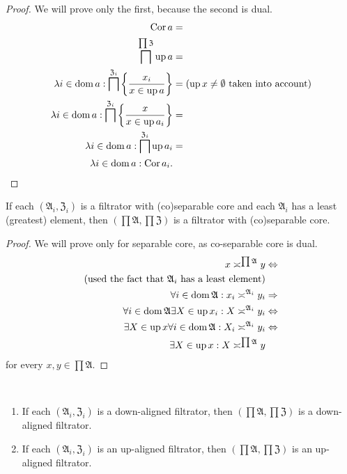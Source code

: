 \begin{proof}
We will prove only the first, because the second is dual.
\begin{align*}
\operatorname{Cor} a & =\\
\bigsqcap^{\prod\mathfrak{Z}}\operatorname{up} a & =\\
\lambda i\in\operatorname{dom} a:\bigsqcap^{\mathfrak{Z}_{i}}\left\{ \frac{x_{i}}{x\in\operatorname{up} a}\right\} & =\text{(\ensuremath{\operatorname{up} x\ne\emptyset} taken into account)}\\
\lambda i\in\operatorname{dom} a:\bigsqcap^{\mathfrak{Z}_{i}}\left\{ \frac{x}{x\in\operatorname{up} a_{i}}\right\} & =\\
\lambda i\in\operatorname{dom} a:\bigsqcap^{\mathfrak{Z}_{i}}\operatorname{up} a_{i} & =\\
\lambda i\in\operatorname{dom} a:\operatorname{Cor} a_{i}.
\end{align*}
\end{proof}
\begin{prop}
If each $(\mathfrak{A}_{i},\mathfrak{Z}_{i})$ is a filtrator with
(co)separable core and each $\mathfrak{A}_{i}$ has a least (greatest)
element, then $\left(\prod\mathfrak{A},\prod\mathfrak{Z}\right)$
is a filtrator with (co)separable core.\end{prop}
\begin{proof}
We will prove only for separable core, as co-separable core is dual.
\begin{align*}
x\asymp^{\prod\mathfrak{A}}y & \Leftrightarrow\\
\text{(used the fact that \ensuremath{\mathfrak{A}_{i}} has a least element)}\\
\forall i\in\operatorname{dom}\mathfrak{A}:x_{i}\asymp^{\mathfrak{A}_{i}}y_{i} & \Rightarrow\\
\forall i\in\operatorname{dom}\mathfrak{A}\exists X\in\operatorname{up} x_{i}:X\asymp^{\mathfrak{A}_{i}}y_{i} & \Leftrightarrow\\
\exists X\in\operatorname{up} x\forall i\in\operatorname{dom}\mathfrak{A}:X_{i}\asymp^{\mathfrak{A}_{i}}y_{i} & \Leftrightarrow\\
\exists X\in\operatorname{up} x:X\asymp^{\prod\mathfrak{A}}y
\end{align*}
for every $x,y\in\prod\mathfrak{A}$.\end{proof}
\begin{obvious}
~
\begin{enumerate}
\item If each $(\mathfrak{A}_{i},\mathfrak{Z}_{i})$ is a down-aligned filtrator,
then $\left(\prod\mathfrak{A},\prod\mathfrak{Z}\right)$ is a down-aligned
filtrator.
\item If each $(\mathfrak{A}_{i},\mathfrak{Z}_{i})$ is an up-aligned filtrator,
then $\left(\prod\mathfrak{A},\prod\mathfrak{Z}\right)$ is an up-aligned
filtrator.
\end{enumerate}
\end{obvious}

